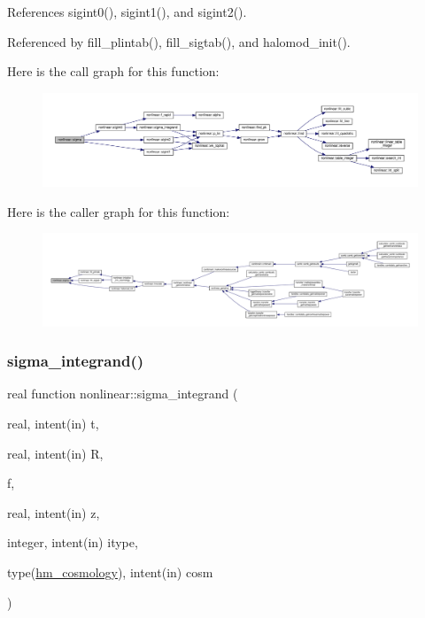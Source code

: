 References sigint0(), sigint1(), and sigint2().



Referenced by fill\+\_\+plintab(), fill\+\_\+sigtab(), and halomod\+\_\+init().

Here is the call graph for this function\+:
\nopagebreak
\begin{figure}[H]
\begin{center}
\leavevmode
\includegraphics[width=350pt]{namespacenonlinear_a5ecb478e809d6e8e185d11dea143cd69_cgraph}
\end{center}
\end{figure}
Here is the caller graph for this function\+:
\nopagebreak
\begin{figure}[H]
\begin{center}
\leavevmode
\includegraphics[width=350pt]{namespacenonlinear_a5ecb478e809d6e8e185d11dea143cd69_icgraph}
\end{center}
\end{figure}
\mbox{\label{namespacenonlinear_a752ac5f748fd7d780ac59ee3a8b4d267}} 
\subsubsection{\texorpdfstring{sigma\+\_\+integrand()}{sigma\_integrand()}}
{\footnotesize\ttfamily real function nonlinear\+::sigma\+\_\+integrand (\begin{DoxyParamCaption}\item[{real, intent(in)}]{t,  }\item[{real, intent(in)}]{R,  }\item[{}]{f,  }\item[{real, intent(in)}]{z,  }\item[{integer, intent(in)}]{itype,  }\item[{type(\mbox{\hyperlink{structnonlinear_1_1hm__cosmology}{hm\+\_\+cosmology}}), intent(in)}]{cosm }\end{DoxyParamCaption})\hspace{0.3cm}{\ttfamily [private]}}



